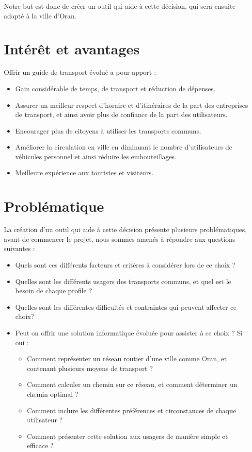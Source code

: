 Notre but est donc de créer un outil qui aide à cette décision, qui sera ensuite adapté à la ville d’Oran.

\section{Intérêt et avantages}
Offrir un guide de transport évolué a pour apport :
\begin{itemize}
	\item Gain considérable de temps, de transport et réduction de dépenses.
	\item Assurer un meilleur respect d'horaire et d'itinéraires de la part des entreprises de transport, et ainsi avoir plus de confiance de la part des utilisateurs.
	\item Encourager plus de citoyens à utiliser les transports communs.
	\item Améliorer la circulation en ville en diminuant le nombre d'utilisateurs de véhicules personnel et ainsi réduire les embouteillages.
	\item Meilleure expérience aux touristes et visiteurs.
\end{itemize}

\section{Problématique}

La création d'un outil qui aide à cette décision présente plusieurs problématiques, avant de commencer le projet, nous sommes amenés à répondre aux questions suivantes :
\begin{itemize}
	\item Quels sont ces différents facteurs et critères à considérer lors de ce choix ?
	\item Quelles sont les différents usagers des transports communs, et quel est le besoin de chaque profile ?
	\item Quelles sont les différentes difficultés et contraintes qui peuvent affecter ce choix?
	\item Peut on offrir une solution informatique évoluée pour assister à ce choix ? Si oui : 
	      \begin{itemize}
	      	\item Comment représenter un réseau routier d'une ville comme Oran, et contenant plusieurs moyens de transport ?
	      	\item Comment calculer un chemin sur ce réseau, et comment déterminer un chemin optimal ?
	      	\item Comment inclure les différentes préférences et circonstances de chaque utilisateur ?
	      	\item Comment présenter cette solution aux usagers de manière simple et efficace ?
	      \end{itemize}
\end{itemize}
			
